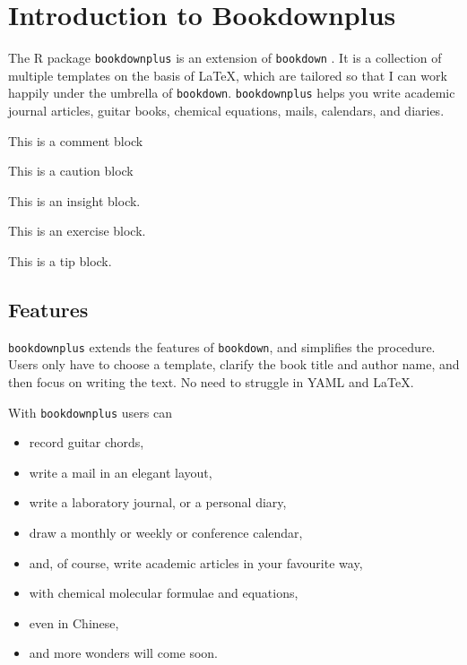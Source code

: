 \documentclass[]{book}
\theoremstyle{definition}
\theoremstyle{definition}
\theoremstyle{definition}
\theoremstyle{remark}
\let\BeginKnitrBlock\begin \let\EndKnitrBlock\end
\begin{document}
\chapter{Introduction to
Bookdownplus}\label{introduction-to-bookdownplus}

The R package \texttt{bookdownplus} \citep{R-bookdownplus} is an
extension of \texttt{bookdown} \citep{R-bookdown}. It is a collection of
multiple templates on the basis of LaTeX, which are tailored so that I
can work happily under the umbrella of \texttt{bookdown}.
\texttt{bookdownplus} helps you write academic journal articles, guitar
books, chemical equations, mails, calendars, and diaries.

\BeginKnitrBlock{rmdcomment}
This is a comment block
\EndKnitrBlock{rmdcomment}

\BeginKnitrBlock{rmdcaution}
This is a caution block
\EndKnitrBlock{rmdcaution}

\BeginKnitrBlock{rmdinsight}
This is an insight block.
\EndKnitrBlock{rmdinsight}

\BeginKnitrBlock{rmdexercise}
This is an exercise block.
\EndKnitrBlock{rmdexercise}

\BeginKnitrBlock{rmdtip}
This is a tip block.
\EndKnitrBlock{rmdtip}

\section{Features}\label{features}

\texttt{bookdownplus} extends the features of \texttt{bookdown}, and
simplifies the procedure. Users only have to choose a template, clarify
the book title and author name, and then focus on writing the text. No
need to struggle in YAML and LaTeX.

With \texttt{bookdownplus} users can

\begin{itemize}
\item
  record guitar chords,
\item
  write a mail in an elegant layout,
\item
  write a laboratory journal, or a personal diary,
\item
  draw a monthly or weekly or conference calendar,
\item
  and, of course, write academic articles in your favourite way,
\item
  with chemical molecular formulae and equations,
\item
  even in Chinese,
\item
  and more wonders will come soon.
\end{itemize}
\end{document}
